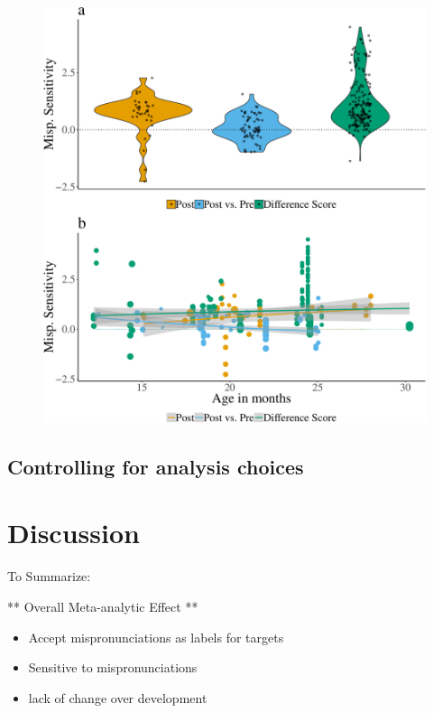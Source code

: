 \documentclass[man]{apa6}
\providecommand{\tightlist}{%
  \setlength{\itemsep}{0pt}\setlength{\parskip}{0pt}}
\theoremstyle{definition}
\theoremstyle{definition}
\theoremstyle{definition}
\theoremstyle{remark}
\begin{document}
\begin{figure}
\centering
\includegraphics{Paper_Analyses_files/figure-latex/Plot_Within_cond_age_diff_score-1.pdf}
\caption{}
\end{figure}

\subsection{Controlling for analysis
choices}\label{controlling-for-analysis-choices}

\section{Discussion}\label{discussion}

To Summarize:

** Overall Meta-analytic Effect **

\begin{itemize}
\tightlist
\item
  Accept mispronunciations as labels for targets
\item
  Sensitive to mispronunciations
\item
  lack of change over development
\end{itemize}
\end{document}
